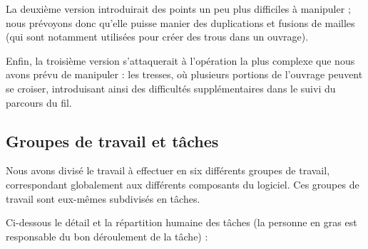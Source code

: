 \documentclass{article}
\begin{document}
La deuxième version introduirait des points un peu plus difficiles à manipuler ; nous prévoyons donc qu'elle puisse manier des duplications et
fusions de mailles (qui sont notamment utilisées pour créer des trous dans un ouvrage).

Enfin, la troisième version s'attaquerait à l'opération la plus complexe que nous avons prévu de manipuler : les tresses, où plusieurs portions
de l'ouvrage peuvent se croiser, introduisant ainsi des difficultés supplémentaires dans le suivi du parcours du fil.

\subsection{Groupes de travail et tâches\label{workpackages}}

Nous avons divisé le travail à effectuer en six différents groupes de travail, correspondant globalement aux différents composants du
logiciel. Ces groupes de travail sont eux-mêmes subdivisés en tâches.

Ci-dessous le détail et la répartition humaine des tâches (la personne en gras est responsable du bon déroulement de la tâche) : \newline
\end{document}
